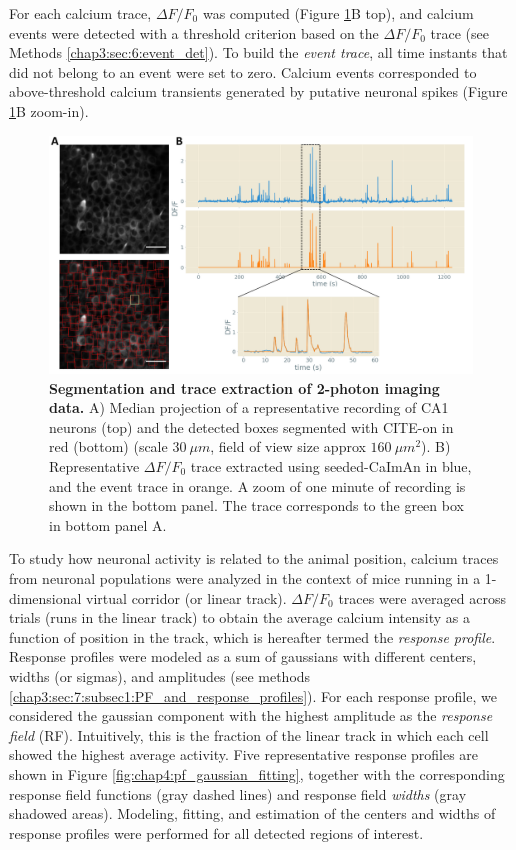 For each calcium trace, $\Delta F/F_0$ was computed (Figure \ref{fig:chap4:segmentation_traces_2p}B top), and calcium events were detected with a threshold criterion based on the $\Delta F/F_0$ trace (see Methods \ref{chap3:sec:6:event_det}).
To build the \textit{event trace}, all time instants that did not belong to an event were set to zero. 
Calcium events corresponded to above-threshold calcium transients generated by putative neuronal spikes (Figure \ref{fig:chap4:segmentation_traces_2p}B zoom-in).
\begin{figure}[h]
    \centering
    \includegraphics[trim={0 0 150 0},clip,width=\textwidth]{Figures/Chapter4/segmentation_traces_2p.pdf}
    \caption[Segmentation and trace extraction of 2-photon imaging data]{\textbf{Segmentation and trace extraction of 2-photon imaging data.} A) Median projection of a representative recording of CA1 neurons (top) and the detected boxes segmented with CITE-on in red (bottom) (scale $30\ \mu m$, field of view size approx $160\ \mu m^2$).
    B) Representative $\Delta F/F_0$ trace extracted using seeded-CaImAn in blue, and the event trace in orange. A zoom of one minute of recording is shown in the bottom panel. The trace corresponds to the green box in bottom panel A.}
    \label{fig:chap4:segmentation_traces_2p}
\end{figure}

To study how neuronal activity is related to the animal position, calcium traces from neuronal populations were analyzed in the context of mice running in a 1-dimensional virtual corridor (or linear track).
$\Delta F/F_0$ traces were averaged across trials (runs in the linear track) to obtain the average calcium intensity as a function of position in the track, which is hereafter termed the \textit{response profile}.
Response profiles were modeled as a sum of gaussians with different centers, widths (or sigmas), and amplitudes (see methods \ref{chap3:sec:7:subsec1:PF_and_response_profiles}). 
For each response profile, we considered the gaussian component with the highest amplitude as the \textit{response field} (RF). 
Intuitively, this is the fraction of the linear track in which each cell showed the highest average activity.
Five representative response profiles are shown in Figure \ref{fig:chap4:pf_gaussian_fitting}, together with the corresponding response field functions (gray dashed lines) and response field \textit{widths} (gray shadowed areas).
Modeling, fitting, and estimation of the centers and widths of response profiles were performed for all detected regions of interest.

